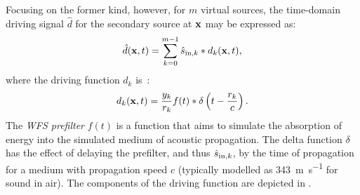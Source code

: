 Focusing on the former kind, however, for $m$ virtual sources, the time-domain
driving signal $\hat{d}$ for the secondary source at $\mathbf{x}$ may be expressed
as:
\begin{equation}
    \label{eq:driving-signal}
    \hat{d}(\mathbf{x},t) = \sum_{k=0}^{m-1}\hat{s}_{\text{in},k} \ast d_k(\mathbf{x},t),
\end{equation}
where the driving function $d_k$ is~\citep{ahrens_analytic_2012}:
\begin{equation}
    \label{eq:driving-function}
    d_k(\mathbf{x},t) = \frac{y_k}{r_k}f(t) \ast \delta\left(t - \frac{r_k}{c}\right).
\end{equation}
The \textit{WFS prefilter} $f(t)$ is a function that aims to simulate the
absorption of energy into the simulated medium of acoustic propagation.
The delta function $\delta$ has the effect of delaying the prefilter, and thus
$\hat{s}_{\text{in},k}$, by the time of propagation for a medium with propagation speed $c$
(typically modelled as \qty[per-mode=symbol]{343}{\m\per\s} for sound in air).
The components of the driving function are depicted in .
